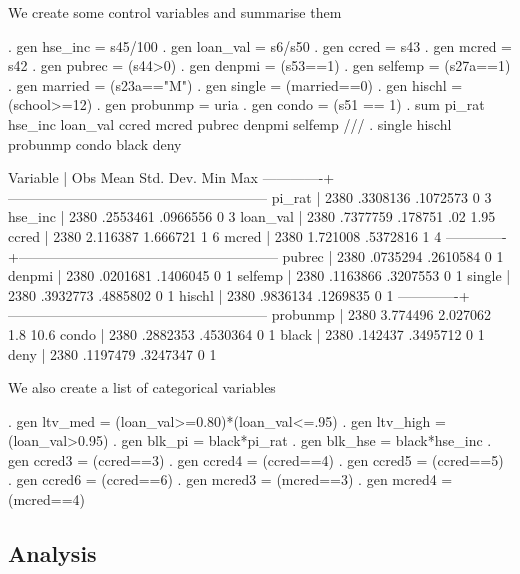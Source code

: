 \documentclass{scrartcl}
\begin{document}
We create some control variables and summarise them

\begin{SinputC}
. gen hse_inc = s45/100
. gen loan_val = s6/s50
. gen ccred = s43
. gen mcred = s42
. gen pubrec = (s44>0)
. gen denpmi = (s53==1)
. gen selfemp = (s27a==1)
. gen married = (s23a=="M")
. gen single = (married==0)
. gen hischl = (school>=12)
. gen probunmp = uria
. gen condo = (s51 == 1)
. sum pi_rat hse_inc loan_val ccred mcred pubrec denpmi selfemp ///
.  single hischl probunmp condo black deny
\end{SinputC}
\begin{SoutputC}
    Variable |       Obs        Mean    Std. Dev.       Min        Max
-------------+--------------------------------------------------------
      pi_rat |      2380    .3308136    .1072573          0          3
     hse_inc |      2380    .2553461    .0966556          0          3
    loan_val |      2380    .7377759     .178751        .02       1.95
       ccred |      2380    2.116387    1.666721          1          6
       mcred |      2380    1.721008    .5372816          1          4
-------------+--------------------------------------------------------
      pubrec |      2380    .0735294    .2610584          0          1
      denpmi |      2380    .0201681    .1406045          0          1
     selfemp |      2380    .1163866    .3207553          0          1
      single |      2380    .3932773    .4885802          0          1
      hischl |      2380    .9836134    .1269835          0          1
-------------+--------------------------------------------------------
    probunmp |      2380    3.774496    2.027062        1.8       10.6
       condo |      2380    .2882353    .4530364          0          1
       black |      2380     .142437    .3495712          0          1
        deny |      2380    .1197479    .3247347          0          1
\end{SoutputC}
 
 We also create a list of categorical variables

\begin{SinputC}
. gen ltv_med = (loan_val>=0.80)*(loan_val<=.95)
. gen ltv_high = (loan_val>0.95) 
. gen blk_pi = black*pi_rat
. gen blk_hse = black*hse_inc
. gen ccred3 = (ccred==3) 
. gen ccred4 = (ccred==4)
. gen ccred5 = (ccred==5)
. gen ccred6 = (ccred==6)
. gen mcred3 = (mcred==3)
. gen mcred4 = (mcred==4)
\end{SinputC}

 \subsection{Analysis}
\end{document}
